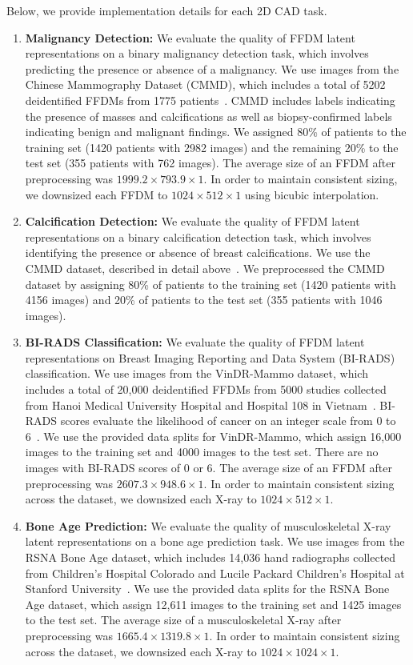 Below, we provide implementation details for each 2D CAD task.
\begin{enumerate}
    \item  \textbf{Malignancy Detection:} We evaluate the quality of FFDM latent representations on a binary malignancy detection task, which involves predicting the presence or absence of a malignancy. We use images from the Chinese Mammography Dataset (CMMD), which includes a total of 5202 deidentified FFDMs from 1775 patients~\cite{cai2023online, cmmddata}. CMMD includes labels indicating the presence of masses and calcifications as well as biopsy-confirmed labels indicating benign and malignant findings. We assigned 80\% of patients to the training set (1420 patients with 2982 images) and the remaining 20\% to the test set (355 patients with 762 images). The average size of an FFDM after preprocessing was $1999.2 \times 793.9 \times 1$. In order to maintain consistent sizing, we downsized each FFDM to $1024 \times 512 \times 1$ using bicubic interpolation. 
    \item \textbf{Calcification Detection:} We evaluate the quality of FFDM latent representations on a binary calcification detection task, which involves identifying the presence or absence of breast calcifications. We use the CMMD dataset, described in detail above~\cite{cmmddata, cai2023online}. We preprocessed the CMMD dataset by assigning 80\% of patients to the training set (1420 patients with 4156 images) and 20\% of patients to the test set (355 patients with 1046 images). 
    \item \textbf{BI-RADS Classification:} We evaluate the quality of FFDM latent representations on Breast Imaging Reporting and Data System (BI-RADS) classification. We use images from the VinDR-Mammo dataset, which includes a total of 20,000 deidentified FFDMs from 5000 studies collected from Hanoi Medical University Hospital and Hospital 108 in Vietnam~\cite{nguyen2022vindrmammo}. BI-RADS scores evaluate the likelihood of cancer on an integer scale from 0 to 6~\cite{nguyen2022vindrmammo}. We use the provided data splits for VinDR-Mammo, which assign 16,000 images to the training set and 4000 images to the test set. There are no images with BI-RADS scores of 0 or 6. The average size of an FFDM after preprocessing was $2607.3 \times 948.6 \times 1$. In order to maintain consistent sizing across the dataset, we downsized each X-ray to $1024 \times 512 \times 1$. 
    \item \textbf{Bone Age Prediction:} We evaluate the quality of musculoskeletal X-ray latent representations on a bone age prediction task. We use images from the RSNA Bone Age dataset, which includes 14,036 hand radiographs collected from Children’s Hospital Colorado and Lucile Packard Children’s Hospital at Stanford University~\cite{rsnaboneage}. We use the provided data splits for the RSNA Bone Age dataset, which assign 12,611 images to the training set and 1425 images to the test set.  The average size of a musculoskeletal X-ray after preprocessing was $1665.4 \times 1319.8 \times 1$. In order to maintain consistent sizing across the dataset, we downsized each X-ray to $1024 \times 1024 \times 1$.

\end{enumerate}
